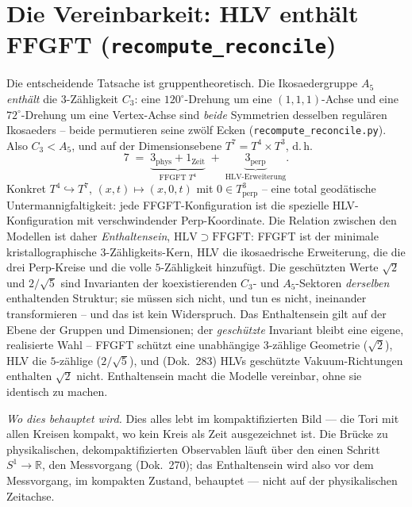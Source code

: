 \section{Die Vereinbarkeit: HLV enth\"alt FFGFT (\texttt{recompute\_reconcile})}
Die entscheidende Tatsache ist gruppentheoretisch. Die Ikosaedergruppe $A_5$ \emph{enthält}
die $3$-Zähligkeit $C_3$: eine $120^\circ$-Drehung um eine $(1,1,1)$-Achse und eine
$72^\circ$-Drehung um eine Vertex-Achse sind \emph{beide} Symmetrien desselben regulären
Ikosaeders -- beide permutieren seine zwölf Ecken (\texttt{recompute\_reconcile.py}). Also
$C_3<A_5$, und auf der Dimensionsebene $T^7=T^4\times T^3$, d.\,h.
\begin{equation}
7 \;=\; \underbrace{3_{\text{phys}}+1_{\text{Zeit}}}_{\text{FFGFT }T^4}\;+\;\underbrace{3_{\text{perp}}}_{\text{HLV-Erweiterung}}.
\end{equation}
Konkret $T^4\hookrightarrow T^7$, $(x,t)\mapsto(x,0,t)$ mit $0\in T^3_{\text{perp}}$ -- eine total geod\"atische Untermannigfaltigkeit: jede FFGFT-Konfiguration ist die spezielle HLV-Konfiguration mit verschwindender Perp-Koordinate. Die Relation zwischen den Modellen ist daher \emph{Enthaltensein}, $\mathrm{HLV}\supset
\mathrm{FFGFT}$: FFGFT ist der minimale kristallographische $3$-Zähligkeits-Kern, HLV die
ikosaedrische Erweiterung, die die drei Perp-Kreise und die volle $5$-Zähligkeit hinzufügt.
Die geschützten Werte $\sqrt2$ und $2/\sqrt5$ sind Invarianten der koexistierenden $C_3$-
und $A_5$-Sektoren \emph{derselben} enthaltenden Struktur; sie müssen sich nicht, und tun
es nicht, ineinander transformieren -- und das ist kein Widerspruch. Das Enthaltensein gilt
auf der Ebene der Gruppen und Dimensionen; der \emph{geschützte} Invariant bleibt eine
eigene, realisierte Wahl -- FFGFT schützt eine unabhängige $3$-zählige Geometrie ($\sqrt2$),
HLV die $5$-zählige ($2/\sqrt5$), und (Dok.~283) HLVs geschützte Vakuum-Richtungen
enthalten $\sqrt2$ nicht. Enthaltensein macht die Modelle vereinbar, ohne sie identisch zu
machen.

\medskip\noindent\emph{Wo dies behauptet wird.} Dies alles lebt im kompaktifizierten Bild --- die Tori mit allen Kreisen kompakt, wo kein Kreis als Zeit ausgezeichnet ist. Die Br\"ucke zu physikalischen, dekompaktifizierten Observablen l\"auft \"uber den einen Schritt $S^1\to\mathbb{R}$, den Messvorgang (Dok.~270); das Enthaltensein wird also vor dem Messvorgang, im kompakten Zustand, behauptet --- nicht auf der physikalischen Zeitachse.

